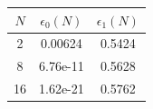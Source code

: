 \begin{tabular}{c|c|c}
\hline
$N$ & $\epsilon_0(N)$ & $\epsilon_1(N)$ \\
\hline
2  & 0.00624 & 0.5424 \\
8  & 6.76e-11 & 0.5628 \\
16 & 1.62e-21 & 0.5762 \\
\hline
\end{tabular}
